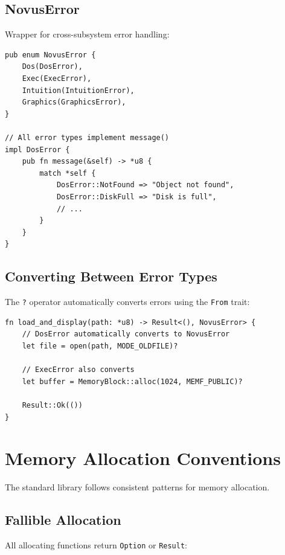 \subsection{NovusError}

Wrapper for cross-subsystem error handling:

\begin{lstlisting}
pub enum NovusError {
    Dos(DosError),
    Exec(ExecError),
    Intuition(IntuitionError),
    Graphics(GraphicsError),
}

// All error types implement message()
impl DosError {
    pub fn message(&self) -> *u8 {
        match *self {
            DosError::NotFound => "Object not found",
            DosError::DiskFull => "Disk is full",
            // ...
        }
    }
}
\end{lstlisting}

\subsection{Converting Between Error Types}

The \texttt{?} operator automatically converts errors using the \texttt{From} trait:

\begin{lstlisting}
fn load_and_display(path: *u8) -> Result<(), NovusError> {
    // DosError automatically converts to NovusError
    let file = open(path, MODE_OLDFILE)?

    // ExecError also converts
    let buffer = MemoryBlock::alloc(1024, MEMF_PUBLIC)?

    Result::Ok(())
}
\end{lstlisting}

\section{Memory Allocation Conventions}
\label{sec:stdlib-memory}

The standard library follows consistent patterns for memory allocation.

\subsection{Fallible Allocation}

All allocating functions return \texttt{Option} or \texttt{Result}:

